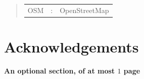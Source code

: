 \documentclass[ %
                    author={Alexander Hill},
                supervisor={Dr. Benjamin Sach},
                    degree={MEng},
                     title={MARMOSET: Multi Agent Real-time Multi-core Online
                     Simulation for Efficient Transportation},
                  subtitle={},
                      type={research},
                      year={2016} ]{dissertation}
\begin{document}

\begin{quote}
\noindent
\begin{tabular}{lcl}
OSM                 &:     & OpenStreetMap \\
\end{tabular}
\end{quote}


\chapter*{Acknowledgements}

{\bf An optional section, of at most $1$ page}
\vspace{1cm}




%
\end{document}
